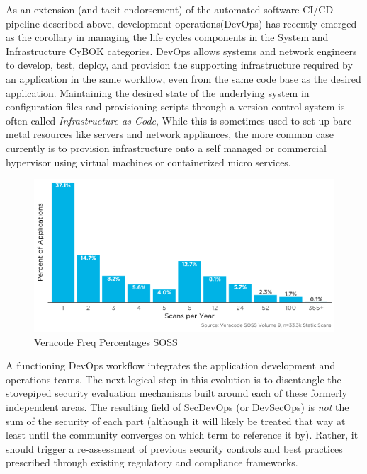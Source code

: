 As an extension (and tacit endorsement) of the automated software CI/CD pipeline described above, development operations(DevOps) has recently emerged as the corollary in managing the life cycles components in the System and Infrastructure CyBOK categories. DevOps allows systems and network engineers to develop, test, deploy, and provision the supporting infrastructure required by an application in the same workflow, even from the same code base as the desired application. Maintaining the desired state of the underlying system in configuration files and provisioning scripts through a version control system is often called \textit{Infrastructure-as-Code}, While this is sometimes used to set up bare metal resources like servers and network appliances, the more common case currently is to provision infrastructure onto a self managed or commercial hypervisor using virtual machines or containerized micro services. 

\begin{figure}[ht]
\centering
\includegraphics[width=.9\linewidth]{resource/img/ch_intro/veracode_scanfreq_percentages.png}
\caption{Veracode Freq Percentages SOSS \cite{soss_v9}}
\label{fig:intro:soss-scan-freq}
\end{figure} 

A functioning DevOps workflow integrates the application development and operations teams. The next logical step in this evolution is to disentangle the stovepiped security evaluation mechanisms built around each of these formerly independent areas. The resulting field of SecDevOps (or DevSecOps\cite{Rahman_Williams_2016}) is \textit{not} the sum of the security of each part (although it will likely be treated that way at least until the community converges on which term to reference it by). Rather, it should trigger a re-assessment of previous security controls and best practices prescribed through existing regulatory and compliance frameworks. 

